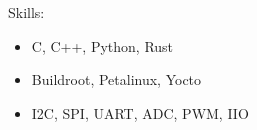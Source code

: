 \noindent Skills:
\begin{itemize}
    \item C, C++, Python, Rust
    \item Buildroot, Petalinux, Yocto
    \item I2C, SPI, UART, ADC, PWM, IIO
\end{itemize}
